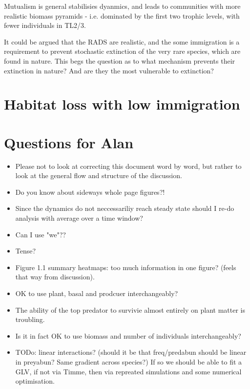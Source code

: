 \begin{itemize}
Mutualism is general stabilisies dyanmics, and leads to communities with more realistic biomass pyramids - i.e. dominated by the first two trophic levels, with fewer individuals in TL2/3. 

It could be argued that the RADS are realistic, and the some immigration is a requirement to prevent stochastic extinction of the very rare species, which are found in nature. This begs the question as to what mechanism prevents their extinction in nature? And are they the most vulnerable to extinction?  

\section{Habitat loss with low immigration}

\section{Questions for Alan}

\begin{itemize}
	\item Please not to look at correcting this document word by word, but rather to look at the general flow and structure of the discussion. 
	\item Do you know about sideways whole page figures?!
	\item Since the dynamics do not neccessariliy reach steady state should I re-do analysis with average over a time window?
	\item Can I use "we"??
	\item Tense?
	\item Figure 1.1 summary heatmaps: too much information in one figure? (feels that way from discussion).
	\item OK to use plant, basal and prodcuer interchangeably?

	\item The ability of the top predator to survivie almost entirely on plant matter is troubling.
	
	\item Is it in fact OK to use biomass and number of individuals interchangeably? 	
	
	\item TODo: linear interactions? (should it be that freq/predabun should be linear in preyabun? Same gradient across species?) If so we should be able to fit a GLV, if not via Timme, then via repreated simulations and some numerical optimisation.

\end{itemize}

\end{itemize}

